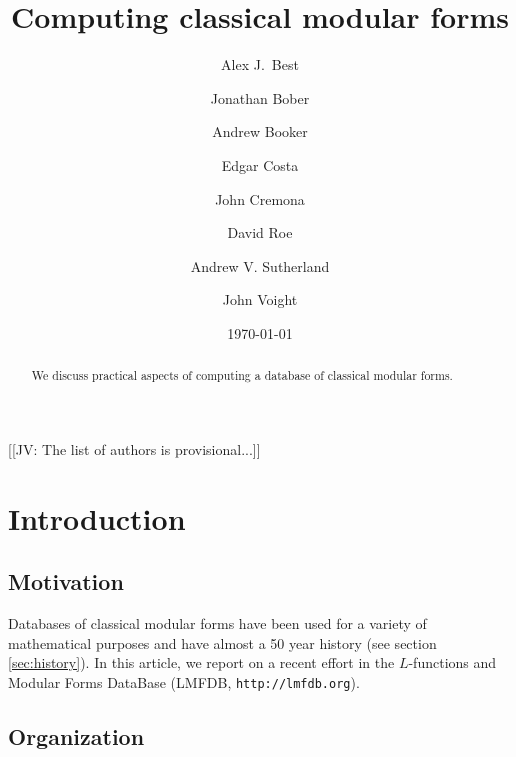 \documentclass[11pt]{amsart}
\numberwithin{equation}{subsection}
\theoremstyle{plain}
\theoremstyle{definition}
\newcommand{\jv}[1]{{\color{red} \textsf{[[JV: #1]]}}}
\begin{document}
\title{Computing classical modular forms}
\author{Alex J.\ Best}
\address{}
\email{}
\urladdr{}

\author{Jonathan Bober}
\address{}
\email{}
\urladdr{}

\author{Andrew Booker}
\address{}
\email{}
\urladdr{}

\author{Edgar Costa}
\address{}
\email{}
\urladdr{}

\author{John Cremona}
\address{}
\email{}
\urladdr{}

\author{David Roe}
\address{}
\email{}
\urladdr{}

\author{Andrew V. Sutherland}
\address{}
\email{}
\urladdr{}

\author{John Voight}
\address{Department of Mathematics, Dartmouth College, 6188 Kemeny Hall, Hanover, NH 03755, USA}

\date{\today}


\begin{abstract}
We discuss practical aspects of computing a database of classical modular forms.
\end{abstract}

\maketitle
\tableofcontents

\jv{The list of authors is provisional...}

\section{Introduction}

\subsection{Motivation}

Databases of classical modular forms have been used for a variety of mathematical purposes and have almost a 50 year history (see section \ref{sec:history}).  In this article, we report on a recent effort in the $L$-functions and Modular Forms DataBase (LMFDB, \verb|http://lmfdb.org|).

\subsection{Organization}
\end{document}
